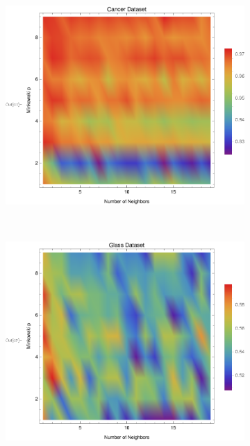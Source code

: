 \documentclass{article}
\begin{document}
		\begin{figure}[h!]
			\centering
			\begin{subfigure}[b]{0.32\textwidth}
				\centering
				\includegraphics[width=\textwidth]{figs/kNN/cancer_plot_kp}	
				\caption{}
				\label{kp_cancer}				
			\end{subfigure}	\	
			\begin{subfigure}[b]{0.32\textwidth}
				\centering
				\includegraphics[width=\textwidth]{figs/kNN/glass_plot_kp}
				\caption{}
				\label{kp_glass}					
			\end{subfigure} \	

\end{figure}
\end{document}
